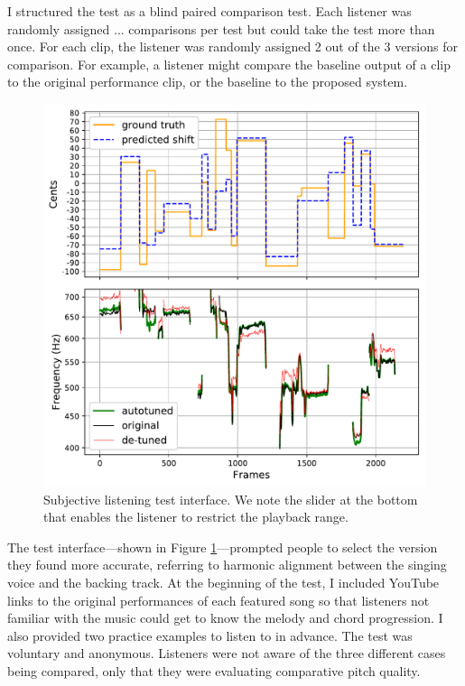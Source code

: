 I structured the test as a blind paired comparison test. Each listener was randomly assigned ... comparisons per test but could take the test more than once. For each clip, the listener was randomly assigned 2 out of the 3 versions for comparison. For example, a listener might compare the baseline output of a clip to the original performance clip, or the baseline to the proposed system. 

\begin{figure}[t]
    \centering
    \includegraphics[width=\columnwidth]{figures/results.pdf}
    \caption{Subjective listening test interface. We note the slider at the bottom that enables the listener to restrict the playback range.}
    \label{fig:listening-test-ide}
\end{figure}

The test interface---shown in Figure \ref{fig:listening-test-ide}---prompted people to select the version they found more accurate, referring to harmonic alignment between the singing voice and the backing track. At the beginning of the test, I included YouTube links to the original performances of each featured song so that listeners not familiar with the music could get to know the melody and chord progression. I also provided two practice examples to listen to in advance. The test was voluntary and anonymous. Listeners were not aware of the three different cases being compared, only that they were evaluating comparative pitch quality. 

